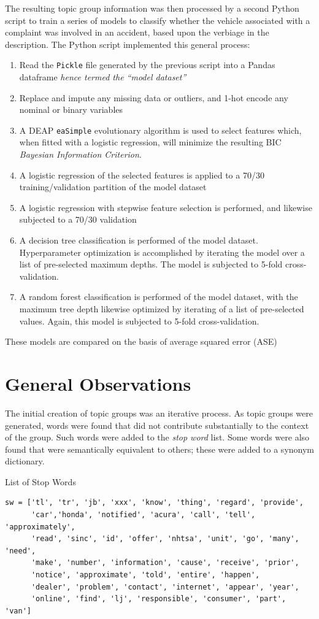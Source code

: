\documentclass[12pt]{article}
\begin{document}
The resulting topic group information was then processed by a second Python script to train a series of models to classify whether the vehicle associated with a complaint was involved in an accident, based upon the verbiage in the description. The Python script implemented this general process:
\begin{enumerate}
\item Read the \texttt{Pickle} file generated by the previous script into a Pandas dataframe \textit{hence termed the ``model dataset''}
\item Replace and impute any missing data or outliers, and 1-hot encode any nominal or binary variables
\item A DEAP \texttt{eaSimple} evolutionary algorithm is used to select features which, when fitted with a logistic regression, will minimize the resulting BIC \textit{Bayesian Information Criterion}.
\item A logistic regression of the selected features is applied to a 70/30 training/validation partition of the model dataset
\item A logistic regression with stepwise feature selection is performed, and likewise subjected to a 70/30 validation
\item A decision tree classification is performed of the model dataset. Hyperparameter optimization is accomplished by iterating the model over a list of pre-selected maximum depths. The model is subjected to 5-fold cross-validation.
\item A random forest classification is performed of the model dataset, with the maximum tree depth likewise optimized by iterating of a list of pre-selected values. Again, this model is subjected to 5-fold cross-validation.
\end{enumerate}
These models are compared on the basis of average squared error (ASE)


\section{General Observations}
The initial creation of topic groups was an iterative process. As topic groups were generated, words were found that did not contribute substantially to the context of the group. Such words were added to the \textit{stop word} list. Some words were also found that were semantically equivalent to others; these were added to a synonym dictionary.

\begin{table}
\caption{List of Stop Words}
\label{tab:stopWords}
{\footnotesize
\begin{lstlisting}
sw = ['tl', 'tr', 'jb', 'xxx', 'know', 'thing', 'regard', 'provide',
      'car','honda', 'notified', 'acura', 'call', 'tell', 'approximately',
      'read', 'sinc', 'id', 'offer', 'nhtsa', 'unit', 'go', 'many', 'need',
      'make', 'number', 'information', 'cause', 'receive', 'prior', 
      'notice', 'approximate', 'told', 'entire', 'happen',
      'dealer', 'problem', 'contact', 'internet', 'appear', 'year',
      'online', 'find', 'lj', 'responsible', 'consumer', 'part', 'van']
\end{lstlisting}
}
\end{table}
\end{document}
